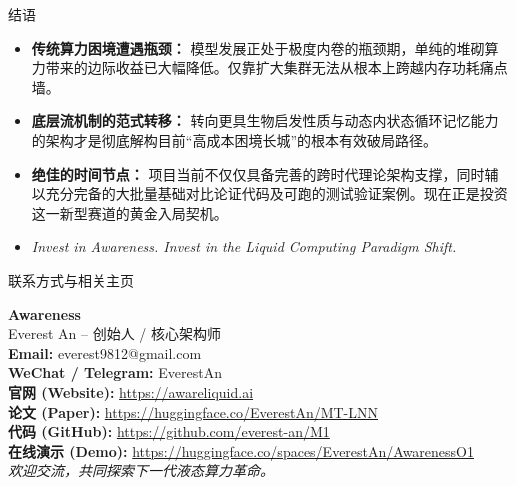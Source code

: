 ﻿\documentclass[aspectratio=169, 10pt]{beamer}
\begin{document}
\begin{frame}{结语}
\begin{itemize}
    \item \textbf{传统算力困境遭遇瓶颈：} 模型发展正处于极度内卷的瓶颈期，单纯的堆砌算力带来的边际收益已大幅降低。仅靠扩大集群无法从根本上跨越内存功耗痛点墙。
    \item \textbf{底层流机制的范式转移：} 转向更具生物启发性质与动态内状态循环记忆能力的架构才是彻底解构目前“高成本困境长城”的根本有效破局路径。
    \item \textbf{绝佳的时间节点：} 项目当前不仅仅具备完善的跨时代理论架构支撑，同时辅以充分完备的大批量基础对比论证代码及可跑的测试验证案例。现在正是投资这一新型赛道的黄金入局契机。
    \vspace{0.5em}
    \item \textit{Invest in Awareness. Invest in the Liquid Computing Paradigm Shift.}
\end{itemize}
\end{frame}

\begin{frame}{联系方式与相关主页}
\begin{center}
    \LARGE \textbf{Awareness} \\
    \vspace{0.5em}
    \large Everest An -- 创始人 / 核心架构师 \\
    \vspace{1.5em}
    \normalsize
    \textbf{Email:} everest9812@gmail.com \\
    \textbf{WeChat / Telegram:} EverestAn \\
    \vspace{1.5em}
    \small
    \textbf{官网 (Website):} \url{https://awareliquid.ai} \\
    \textbf{论文 (Paper):} \url{https://huggingface.co/EverestAn/MT-LNN} \\
    \textbf{代码 (GitHub):} \url{https://github.com/everest-an/M1} \\
    \textbf{在线演示 (Demo):} \url{https://huggingface.co/spaces/EverestAn/AwarenessO1} \\
    \vspace{1.5em}
    \textit{欢迎交流，共同探索下一代液态算力革命。}
\end{center}
\end{frame}
\end{document}

